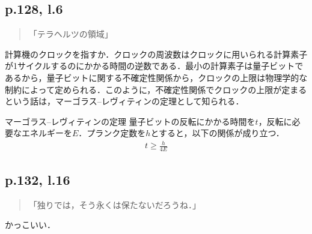 \documentclass[10pt, a5paper, twoside]{ltjsarticle}
\newcommand{\hyphen}{\insertkanjiskip--\insertkanjiskip}
\begin{document}
        \subsection{p.128, l.6}

            \begin{quote}
                「テラヘルツの領域」
            \end{quote}

            計算機のクロックを指すか．クロックの周波数はクロックに用いられる計算素子が1サイクルするのにかかる時間の逆数である．最小の計算素子は量子ビットであるから，量子ビットに関する不確定性関係から，クロックの上限は物理学的な制約によって定められる．このように，不確定性関係でクロックの上限が定まるという話は，マーゴラス\hyphen レヴィティンの定理として知られる．

            \begin{thm}{マーゴラス\hyphen レヴィティンの定理}{}
                量子ビットの反転にかかる時間を$t$，反転に必要なエネルギーを$E$．プランク定数を$h$とすると，以下の関係が成り立つ．
                \begin{align*}
                    t \geq \frac{h}{4 E}
                \end{align*}
            \end{thm}

        \subsection{p.132, l.16}

            \begin{quote}
                「独りでは，そう永くは保たないだろうね．」
            \end{quote}

            かっこいい．

    \newpage
\end{document}
